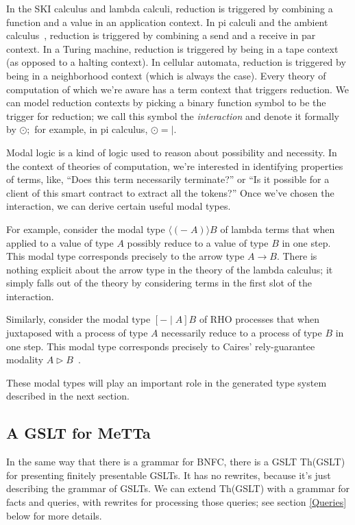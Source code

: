 \documentclass{article}
\begin{document}
In the SKI calculus and lambda calculi, reduction is triggered by combining a function and a value in an application context.  In pi calculi and the ambient calculus~\cite{CardelliGordon2000}, reduction is triggered by combining a send and a receive in par context.  In a Turing machine, reduction is triggered by being in a tape context (as opposed to a halting context).  In cellular automata, reduction is triggered by being in a neighborhood context (which is always the case).  Every theory of computation of which we're aware has a term context that triggers reduction. We can model reduction contexts by picking a binary function symbol to be the trigger for reduction; we call this symbol the {\em interaction} and denote it formally by $\odot;$ for example, in pi calculus, $\odot = |.$  

Modal logic is a kind of logic used to reason about possibility and necessity.  In the context of theories of computation, we're interested in identifying properties of terms, like, ``Does this term necessarily terminate?'' or ``Is it possible for a client of this smart contract to extract all the tokens?''  Once we've chosen the interaction, we can derive certain useful modal types.  

For example, consider the modal type $\langle (- \; A) \rangle B$ of lambda terms that when applied to a value of type $A$ possibly reduce to a value of type $B$ in one step.  This modal type corresponds precisely to the arrow type $A \to B.$  There is nothing explicit about the arrow type in the theory of the lambda calculus; it simply falls out of the theory by considering terms in the first slot of the interaction.

Similarly, consider the modal type $[ - \; |\; A ] B$ of RHO processes that when juxtaposed with a process of type $A$ necessarily reduce to a process of type $B$ in one step.  This modal type corresponds precisely to Caires' rely-guarantee modality $A \triangleright B$~\cite{Caires2007}.

These modal types will play an important role in the generated type system described in the next section.

\subsection{A GSLT for MeTTa}
In the same way that there is a grammar for BNFC, there is a GSLT Th(GSLT) for presenting finitely presentable GSLTs.  It has no rewrites, because it's just describing the grammar of GSLTs.  We can extend Th(GSLT) with a grammar for facts and queries, with rewrites for processing those queries; see section \ref{Queries} below for more details.
\end{document}
